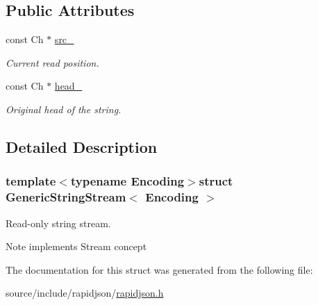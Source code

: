 \subsection*{Public Attributes}
\begin{DoxyCompactItemize}
\item 
\hypertarget{struct_generic_string_stream_aeda813798e3f2d6bfdac86afc11b6b80}{}const Ch $\ast$ \hyperlink{struct_generic_string_stream_aeda813798e3f2d6bfdac86afc11b6b80}{src\+\_\+}\label{struct_generic_string_stream_aeda813798e3f2d6bfdac86afc11b6b80}

\begin{DoxyCompactList}\small\item\em Current read position. \end{DoxyCompactList}\item 
\hypertarget{struct_generic_string_stream_a3c86ef1e1f0655028cb8a3afce11ee4f}{}const Ch $\ast$ \hyperlink{struct_generic_string_stream_a3c86ef1e1f0655028cb8a3afce11ee4f}{head\+\_\+}\label{struct_generic_string_stream_a3c86ef1e1f0655028cb8a3afce11ee4f}

\begin{DoxyCompactList}\small\item\em Original head of the string. \end{DoxyCompactList}\end{DoxyCompactItemize}


\subsection{Detailed Description}
\subsubsection*{template$<$typename Encoding$>$struct Generic\+String\+Stream$<$ Encoding $>$}

Read-\/only string stream. 

\begin{DoxyNote}{Note}
implements Stream concept 
\end{DoxyNote}


The documentation for this struct was generated from the following file\+:\begin{DoxyCompactItemize}
\item 
source/include/rapidjson/\hyperlink{rapidjson_8h}{rapidjson.\+h}\end{DoxyCompactItemize}
